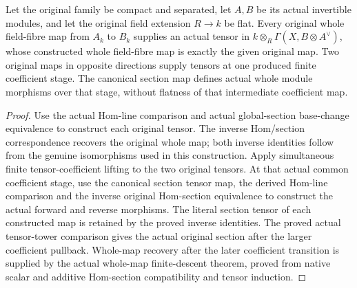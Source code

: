 \begin{lemma}
\label{lem:kn-arithmetic-original-line-power-morphisms}
\leanok
{}
Let the original family be compact and separated, let $A,B$ be its actual
invertible modules, and let the original field extension $R\to k$ be flat.
Every original whole field-fibre map from $A_k$ to $B_k$ supplies an actual
tensor in $k\otimes_R\Gamma(X,B\otimes A^\vee)$, whose constructed
whole field-fibre map is exactly the given original map. Two original maps
in opposite directions supply tensors at one produced finite coefficient
stage. The canonical section map defines actual whole module morphisms
over that stage, without flatness of that intermediate coefficient map.
\end{lemma}
\begin{proof}
Use the actual Hom-line comparison and actual global-section base-change
equivalence to construct each original tensor.  The inverse Hom/section
correspondence recovers the original whole map; both inverse identities
follow from the genuine isomorphisms used in this construction.  Apply
simultaneous finite tensor-coefficient lifting to the two original tensors.
At that actual common coefficient stage, use the canonical section tensor
map, the derived Hom-line comparison and the inverse original Hom-section
equivalence to construct the actual forward and reverse morphisms.
The literal section tensor of each constructed map is retained by the
proved inverse identities. The proved actual tensor-tower comparison gives
the actual original section after the larger coefficient pullback.
Whole-map recovery after the later coefficient transition is supplied by
the actual whole-map finite-descent theorem, proved from native scalar
and additive Hom-section compatibility and tensor induction.
\end{proof}

